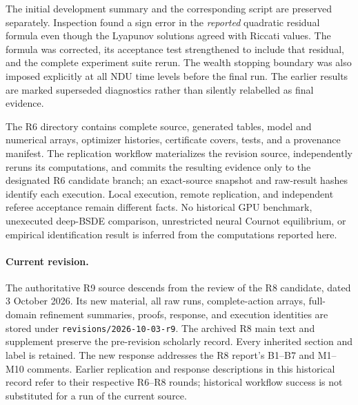 \documentclass[ecta,draft]{econsocart}
\theoremstyle{definition}
\theoremstyle{remark}
\begin{document}
\begin{appendix}
The initial development summary and the corresponding script are preserved separately. Inspection found a sign error in the \emph{reported} quadratic residual formula even though the Lyapunov solutions agreed with Riccati values. The formula was corrected, its acceptance test strengthened to include that residual, and the complete experiment suite rerun. The wealth stopping boundary was also imposed explicitly at all NDU time levels before the final run. The earlier results are marked superseded diagnostics rather than silently relabelled as final evidence.

The R6 directory contains complete source, generated tables, model and numerical arrays, optimizer histories, certificate covers, tests, and a provenance manifest. The replication workflow materializes the revision source, independently reruns its computations, and commits the resulting evidence only to the designated R6 candidate branch; an exact-source snapshot and raw-result hashes identify each execution. Local execution, remote replication, and independent referee acceptance remain different facts. No historical GPU benchmark, unexecuted deep-BSDE comparison, unrestricted neural Cournot equilibrium, or empirical identification result is inferred from the computations reported here.
\end{appendix}
\paragraph{Current revision.} The authoritative R9 source descends from the review of the R8 candidate, dated 3 October 2026. Its new material, all raw runs, complete-action arrays, full-domain refinement summaries, proofs, response, and execution identities are stored under \texttt{revisions/2026-10-03-r9}. The archived R8 main text and supplement preserve the pre-revision scholarly record. Every inherited section and label is retained. The new response addresses the R8 report's B1--B7 and M1--M10 comments. Earlier replication and response descriptions in this historical record refer to their respective R6--R8 rounds; historical workflow success is not substituted for a run of the current source.



\end{document}
